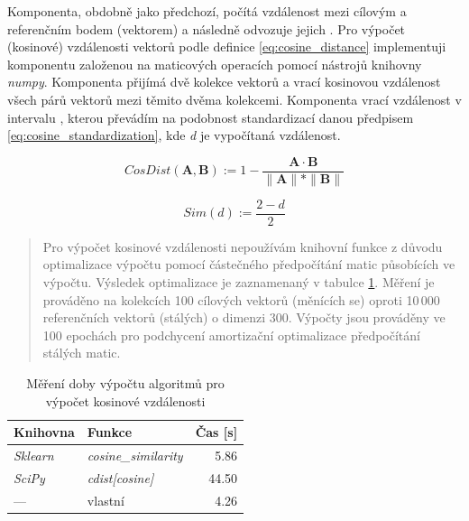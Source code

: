 \documentclass[thesis=M,czech]{FITthesis}[2019/12/23]
\begin{document}
Komponenta, obdobně jako předchozí, počítá vzdálenost mezi cílovým a referenčním bodem (vektorem) a následně odvozuje jejich .
Pro výpočet (kosinové) vzdálenosti vektorů podle definice \ref{eq:cosine_distance} implementuji komponentu založenou na maticových operacích pomocí nástrojů knihovny \textit{numpy}.
Komponenta  přijímá dvě kolekce vektorů a vrací kosinovou vzdálenost všech párů vektorů mezi těmito dvěma kolekcemi.
Komponenta vrací vzdálenost v intervalu \interval[0,2], kterou převádím na podobnost standardizací danou předpisem \ref{eq:cosine_standardization}, kde \textit{d} je vypočítaná vzdálenost.

\begin{equation} \label{eq:cosine_distance}
CosDist(\mathbf{A}, \mathbf{B}) := 1 - \frac{\mathbf{A} \cdot \mathbf{B}}{\| \mathbf{A}\|*\| \mathbf{B}\|}
\end{equation}

\begin{equation} \label{eq:cosine_standardization}
Sim(d) := \frac{2-d}{2}
\end{equation}

\begin{quote}
    Pro výpočet kosinové vzdálenosti nepoužívám knihovní funkce z důvodu optimalizace výpočtu pomocí částečného předpočítání matic působících ve výpočtu. Výsledek optimalizace je zaznamenaný v tabulce \ref{table:experiment_similarity}. Měření je prováděno na kolekcích 100 cílových vektorů (měnících se) oproti 10\,000 referenčních vektorů (stálých) o dimenzi 300. Výpočty jsou prováděny ve 100 epochách pro podchycení amortizační optimalizace předpočítání stálých matic.
\end{quote}
\begin{table}[h!]
\centering
\begin{tabular}{ |l|l|r| }
\hline
Knihovna & Funkce & Čas [s] \\\hline
\hline
\textit{Sklearn}\footnotemark & \textit{cosine\_similarity} & 5.86 \\
\textit{SciPy}\footnotemark & \textit{cdist[cosine]} & 44.50 \\
--- & vlastní & 4.26 \\\hline
\end{tabular}
\caption{Měření doby výpočtu algoritmů pro výpočet kosinové vzdálenosti}
\label{table:experiment_similarity}
\end{table}
\newpage
\end{document}
